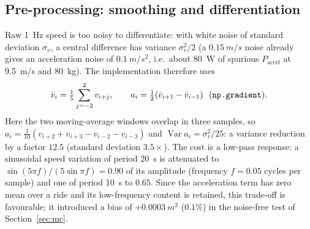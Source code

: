 \documentclass[11pt,a4paper]{article}
\newcommand{\code}[1]{\texttt{\detokenize{#1}}}
\DeclareMathOperator{\Var}{Var}
\begin{document}
\subsection{Pre-processing: smoothing and differentiation}
Raw \SI{1}{Hz} speed is too noisy to differentiate: with white noise of standard deviation \(\sigma_v\), a central difference has variance \(\sigma_v^2/2\) (a \(\SI{0.15}{m/s}\) noise already gives an acceleration noise of \(\SI{0.1}{m/s^2}\), i.e.\ about \SI{80}{W} of spurious \(P_{\mathrm{accel}}\) at \SI{9.5}{m/s} and \SI{80}{kg}). The implementation therefore uses
\begin{equation}
 \bar v_i=\tfrac15\sum_{j=-2}^{2}v_{i+j},\qquad a_i=\tfrac12(\bar v_{i+1}-\bar v_{i-1})\ \ (\text{\code{np.gradient}}).
\end{equation}
Here the two moving-average windows overlap in three samples, so \(a_i=\tfrac1{10}(v_{i+2}+v_{i+3}-v_{i-2}-v_{i-3})\) and \(\Var a_i=\sigma_v^2/25\): a variance reduction by a factor \(12.5\) (standard deviation \(3.5\times\)). The cost is a low-pass response: a sinusoidal speed variation of period \SI{20}{s} is attenuated to \(\sin(5\pi f)/(5\sin\pi f)=0.90\) of its amplitude (frequency \(f=0.05\) cycles per sample) and one of period \SI{10}{s} to \(0.65\). Since the acceleration term has zero mean over a ride and its low-frequency content is retained, this trade-off is favourable; it introduced a bias of \(+0.0003\ \si{m^2}\) (\(0.1\%\)) in the noise-free test of Section~\ref{sec:mc}.
\end{document}

